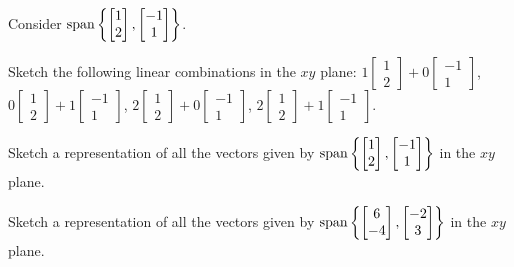 \begin{applicationActivities}{2}{8}
\begin{activity}{10}
  Consider \(\operatorname{span}\left\{\begin{bmatrix}1\\2\end{bmatrix},
  \begin{bmatrix}-1\\1\end{bmatrix}\right\}\).
  \begin{subactivity}
    Sketch the following linear combinations in the \(xy\) plane:
    \(1\begin{bmatrix}1\\2\end{bmatrix}+
    0\begin{bmatrix}-1\\1\end{bmatrix}\),
    \(0\begin{bmatrix}1\\2\end{bmatrix}+
    1\begin{bmatrix}-1\\1\end{bmatrix}\),
    \(2\begin{bmatrix}1\\2\end{bmatrix}+
    0\begin{bmatrix}-1\\1\end{bmatrix}\),
    \(2\begin{bmatrix}1\\2\end{bmatrix}+
    1\begin{bmatrix}-1\\1\end{bmatrix}\).
  \end{subactivity}
  \begin{subactivity}
    Sketch a representation of all the vectors given by
    \(\operatorname{span}\left\{\begin{bmatrix}1\\2\end{bmatrix},
     \begin{bmatrix}-1\\1\end{bmatrix}\right\}\)
    in the \(xy\) plane.
  \end{subactivity}
\end{activity}

\begin{activity}{5}
    Sketch a representation of all the vectors given by
    \(\operatorname{span}\left\{\begin{bmatrix}6\\-4\end{bmatrix},
     \begin{bmatrix}-2\\3\end{bmatrix}\right\}\)
    in the \(xy\) plane.
\end{activity}


\end{applicationActivities}
